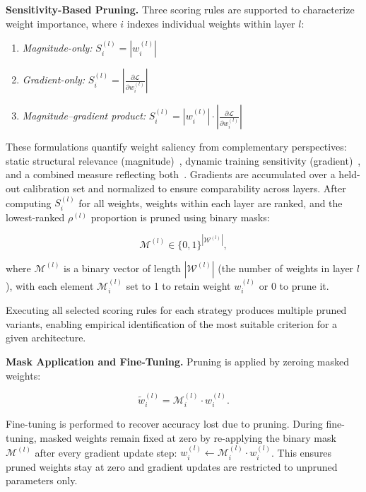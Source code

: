 \documentclass[11pt, conference]{IEEEtran}
\begin{document}
\textbf{Sensitivity-Based Pruning.}
Three scoring rules are supported to characterize weight importance, where $i$ indexes individual weights within layer $l$:

\begin{enumerate}
    \item \textit{Magnitude-only:} \quad $S_i^{(l)} = |w_i^{(l)}|$ \cite{han2015learning}
    \item \textit{Gradient-only:} \quad $S_i^{(l)} = \left|\frac{\partial \mathcal{L}}{\partial w_i^{(l)}}\right|$ \cite{lee2018snip}
    \item \textit{Magnitude--gradient product:} \quad $S_i^{(l)} = |w_i^{(l)}| \cdot \left|\frac{\partial \mathcal{L}}{\partial w_i^{(l)}}\right|$ \cite{wang2020picking}
\end{enumerate}

These formulations quantify weight saliency from complementary perspectives: static structural relevance (magnitude)~\cite{han2015learning}, dynamic training sensitivity (gradient)~\cite{lee2018snip}, and a combined measure reflecting both~\cite{wang2020picking}. Gradients are accumulated over a held-out calibration set and normalized to ensure comparability across layers. After computing $S_i^{(l)}$ for all weights, weights within each layer are ranked, and the lowest-ranked $\rho^{(l)}$ proportion is pruned using binary masks:

\begin{equation}
\mathcal{M}^{(l)} \in \{0,1\}^{|\mathcal{W}^{(l)}|},
\end{equation}

where $\mathcal{M}^{(l)}$ is a binary vector of length $|\mathcal{W}^{(l)}|$ (the number of weights in layer $l$), with each element $\mathcal{M}_i^{(l)}$ set to 1 to retain weight $w_i^{(l)}$ or 0 to prune it.

Executing all selected scoring rules for each strategy produces multiple pruned variants, enabling empirical identification of the most suitable criterion for a given architecture.

\textbf{Mask Application and Fine-Tuning.}
Pruning is applied by zeroing masked weights:

\begin{equation}
\tilde{w}_i^{(l)} = \mathcal{M}_i^{(l)} \cdot w_i^{(l)}.
\end{equation}

Fine-tuning is performed to recover accuracy lost due to pruning. During fine-tuning, masked weights remain fixed at zero by re-applying the binary mask $\mathcal{M}^{(l)}$ after every gradient update step: $w_i^{(l)} \leftarrow \mathcal{M}_i^{(l)} \cdot w_i^{(l)}$. This ensures pruned weights stay at zero and gradient updates are restricted to unpruned parameters only.
\end{document}
